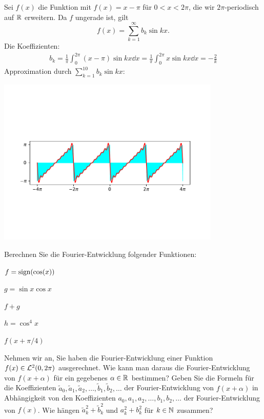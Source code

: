 \begin{bsp}
	Sei $f(x)$ die Funktion mit $f(x) = x- \pi$ für $0 < x < 2 \pi$, die wir $2\pi$-periodisch auf $\mathbb{R}$ erweitern. Da $f$ ungerade ist, gilt 
\[
 f (x)  = \sum_{k=1}^\infty b_k \sin k x. 
\]
Die Koeffizienten:
\begin{align*}
b_k = \frac{1}{\pi} \int_0^{2 \pi} (x-\pi) \sin k x \dd x = \frac{1}{\pi} \int_0^{2 \pi} x \sin k x \dd x = - \frac{2}{k} 
\end{align*}
Approximation durch $\sum_{k=1}^{10} b_k \sin k x$: 
	\begin{center}
	\includegraphics[width=0.8\textwidth]{pics/fourier.pdf}
\end{center}
\end{bsp} 

\begin{aufg} Berechnen Sie die Fourier-Entwicklung folgender Funktionen: \label{aufg:fourier:sin:cos:etc}
	\begin{enuma}
		\item $f = \operatorname{sign} (\cos (x))$
		\item $g = \sin x \cos x$
		\item $f+g$
		\item $h = \cos^4 x$
		\item $f(x+\pi/4)$
	\end{enuma} 
\end{aufg} 

\begin{aufg} 
	Nehmen wir an, Sie haben die Fourier-Entwicklung einer Funktion $f(x) \in \mathcal{L}^2(0,2 \pi)$ ausgerechnet. Wie kann man daraus die Fourier-Entwicklung von $f(x+\alpha)$ für ein gegebenes $\alpha \in \mathbb{R}$ bestimmen? Geben Sie die Formeln für die Koeffizienten $\tilde{a}_0, \tilde{a}_1, \tilde{a}_2,\ldots, \tilde{b}_1,\tilde{b}_2,\ldots$ der Fourier-Entwicklung von $f(x+\alpha)$ in Abhängigkeit von den Koeffizienten $a_0,a_1,a_2,\ldots, b_1,b_2,\ldots$ der Fourier-Entwicklung von $f(x)$. 
	Wie hängen $\tilde{a}_k^2 + \tilde{b}_k^2$ und $a_k^2  + b_k^2$ für $k \in \mathbb{N}$ zusammen? 
\end{aufg} 

